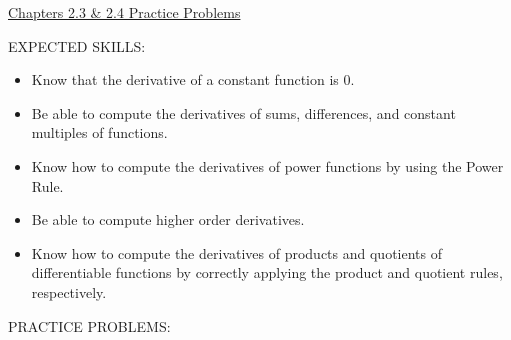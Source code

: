 \documentclass[12pt]{article}
\begin{document}
\begin{center}
\underline{\LARGE{Chapters 2.3 \& 2.4 Practice Problems}}
\end{center}

\noindent EXPECTED SKILLS:

\begin{itemize}

\item Know that the derivative of a constant function is 0.

\item Be able to compute the derivatives of sums, differences, and constant multiples of functions.

\item Know how to compute the derivatives of power functions by using the Power Rule.

\item Be able to compute higher order derivatives.

\item Know how to compute the derivatives of products and quotients of differentiable functions by correctly applying the product and quotient rules, respectively.

\end{itemize}

\noindent PRACTICE PROBLEMS:

\medskip
\end{document}
